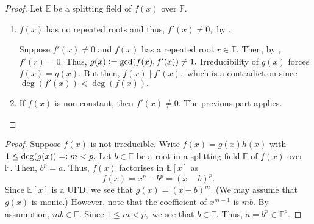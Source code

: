 \irredsepderiv*\label{prop:irredsepderiv2}
\begin{flushright}\hyperref[prop:irredsepderiv]{\upsym}\end{flushright}
\begin{proof}
    Let $\mathbb{E}$ be a splitting field of $f(x)$ over $\mathbb{F}.$
    \begin{enumerate}
        \item \forward $f(x)$ has no repeated roots and thus, $f'(x) \neq 0,$ by .

        \backward Suppose $f'(x) \neq 0$ and $f(x)$ has a repeated root $r \in \mathbb{E}.$ Then, by , $f'(r) = 0.$ Thus, $g(x) \vcentcolon= \gcd(f(x), f'(x)) \neq 1.$ Irreducibility of $g(x)$ forces $f(x) = g(x).$ But then, $f(x) \mid f'(x),$ which is a contradiction since $\deg(f'(x)) < \deg(f(x)).$
        \item If $f(x)$ is non-constant, then $f'(x) \neq 0.$ The previous part applies.
    \end{enumerate} 
\end{proof}

\xppolyirredorroot*\label{prop:xppolyirredorroot2}
\begin{flushright}\hyperref[prop:xppolyirredorroot]{\upsym}\end{flushright}
\begin{proof}
    Suppose $f(x)$ is not irreducible. Write $f(x) = g(x)h(x)$ with $1 \le \deg(g(x)) =\vcentcolon m < p.$ Let $b \in \mathbb{E}$ be a root in a splitting field $\mathbb{E}$ of $f(x)$ over $\mathbb{F}.$ Then, $b^p = a.$ Thus, $f(x)$ factorises in $\mathbb{E}[x]$ as
    \begin{equation*} 
        f(x) = x^p - b^p = (x - b)^p.
    \end{equation*}
    Since $\mathbb{E}[x]$ is a UFD, we see that $g(x) = (x - b)^m.$ (We may assume that $g(x)$ is monic.) However, note that the coefficient of $x^{m - 1}$ is $mb.$ By assumption, $mb \in \mathbb{F}.$ Since $1 \le m < p,$ we see that $b \in \mathbb{F}.$ Thus, $a = b^p \in \mathbb{F}^p.$     
\end{proof}

